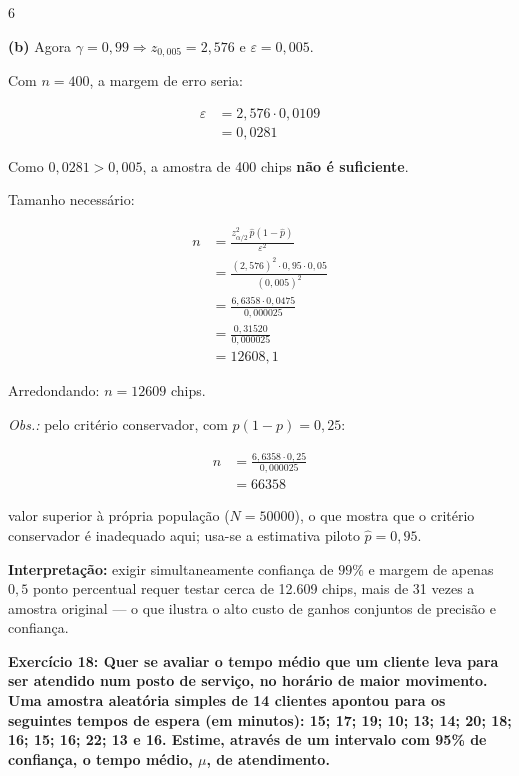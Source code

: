 \documentclass[8pt, a4paper, landscape]{extarticle}
\begin{document}
\begin{multicols}{6}
\vspace{0.2cm}

\textbf{(b)} Agora $\gamma = 0,99 \Rightarrow z_{0,005} = 2,576$ e $\varepsilon = 0,005$.

Com $n = 400$, a margem de erro seria:

\begin{equation*}
\begin{split}
\varepsilon &= 2,576 \cdot 0,0109 \\
&= 0,0281
\end{split}
\end{equation*}

Como $0,0281 > 0,005$, a amostra de 400 chips \textbf{não é suficiente}.

Tamanho necessário:

\begin{equation*}
\begin{split}
n &= \frac{z_{\alpha/2}^2\,\hat{p}(1-\hat{p})}{\varepsilon^2} \\
&= \frac{(2,576)^2 \cdot 0,95 \cdot 0,05}{(0,005)^2} \\
&= \frac{6,6358 \cdot 0,0475}{0,000025} \\
&= \frac{0,31520}{0,000025} \\
&= 12608,1
\end{split}
\end{equation*}

Arredondando: $n = 12609$ chips.

\textit{Obs.:} pelo critério conservador, com $p(1-p) = 0,25$:

\begin{equation*}
\begin{split}
n &= \frac{6,6358 \cdot 0,25}{0,000025} \\
&= 66358
\end{split}
\end{equation*}

valor superior à própria população ($N = 50000$), o que mostra que o critério conservador é inadequado aqui; usa-se a estimativa piloto $\hat{p} = 0,95$.

\textbf{Interpretação:} exigir simultaneamente confiança de $99\%$ e margem de apenas $0,5$ ponto percentual requer testar cerca de 12.609 chips, mais de 31 vezes a amostra original — o que ilustra o alto custo de ganhos conjuntos de precisão e confiança.

\textbf{Exercício 18: Quer se avaliar o tempo médio que um cliente leva para ser atendido num posto de serviço, no horário de maior movimento. Uma amostra aleatória simples de 14 clientes apontou para os seguintes tempos de espera (em minutos): 15; 17; 19; 10; 13; 14; 20; 18; 16; 15; 16; 22; 13 e 16. Estime, através de um intervalo com 95\% de confiança, o tempo médio, $\mu$, de atendimento.}


\end{multicols}
\end{document}
